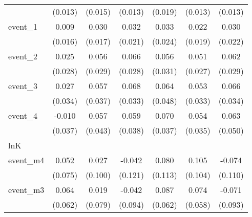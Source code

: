 {\begin{tabular}{l*{6}{c}}
            &     (0.013)         &     (0.015)         &     (0.013)         &     (0.019)         &     (0.013)         &     (0.013)         \\
[1em]
event\_1     &       0.009         &       0.030         &       0.032         &       0.033         &       0.022         &       0.030         \\
            &     (0.016)         &     (0.017)         &     (0.021)         &     (0.024)         &     (0.019)         &     (0.022)         \\
[1em]
event\_2     &       0.025         &       0.056         &       0.066\sym{*}  &       0.056         &       0.051         &       0.062\sym{*}  \\
            &     (0.028)         &     (0.029)         &     (0.028)         &     (0.031)         &     (0.027)         &     (0.029)         \\
[1em]
event\_3     &       0.027         &       0.057         &       0.068\sym{*}  &       0.064         &       0.053         &       0.066         \\
            &     (0.034)         &     (0.037)         &     (0.033)         &     (0.048)         &     (0.033)         &     (0.034)         \\
[1em]
event\_4     &      -0.010         &       0.057         &       0.059         &       0.070         &       0.054         &       0.063         \\
            &     (0.037)         &     (0.043)         &     (0.038)         &     (0.037)         &     (0.035)         &     (0.050)         \\
\hline
lnK         &                     &                     &                     &                     &                     &                     \\
event\_m4    &       0.052         &       0.027         &      -0.042         &       0.080         &       0.105         &      -0.074         \\
            &     (0.075)         &     (0.100)         &     (0.121)         &     (0.113)         &     (0.104)         &     (0.110)         \\
[1em]
event\_m3    &       0.064         &       0.019         &      -0.042         &       0.087         &       0.074         &      -0.071         \\
            &     (0.062)         &     (0.079)         &     (0.094)         &     (0.062)         &     (0.058)         &     (0.093)         \\

\end{tabular}}
